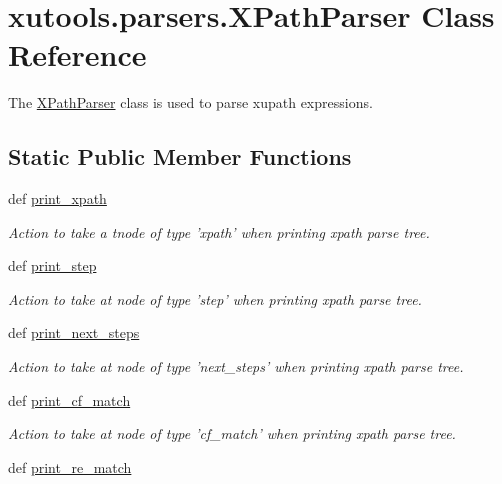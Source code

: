 \hypertarget{classxutools_1_1parsers_1_1_x_path_parser}{\section{xutools.\-parsers.\-X\-Path\-Parser Class Reference}
\label{classxutools_1_1parsers_1_1_x_path_parser}
}


The \hyperlink{classxutools_1_1parsers_1_1_x_path_parser}{X\-Path\-Parser} class is used to parse xupath expressions.  


\subsection*{Static Public Member Functions}
\begin{DoxyCompactItemize}
\item 
def \hyperlink{classxutools_1_1parsers_1_1_x_path_parser_ab00288a4a70d10d079cf2e6ed771c233}{print\-\_\-xpath}
\begin{DoxyCompactList}\small\item\em Action to take a tnode of type 'xpath' when printing xpath parse tree. \end{DoxyCompactList}\item 
def \hyperlink{classxutools_1_1parsers_1_1_x_path_parser_ad75595ece121f86d16d784636ffdf96c}{print\-\_\-step}
\begin{DoxyCompactList}\small\item\em Action to take at node of type 'step' when printing xpath parse tree. \end{DoxyCompactList}\item 
def \hyperlink{classxutools_1_1parsers_1_1_x_path_parser_a6a04eb60bf1047384e7d24a11a4d217b}{print\-\_\-next\-\_\-steps}
\begin{DoxyCompactList}\small\item\em Action to take at node of type 'next\-\_\-steps' when printing xpath parse tree. \end{DoxyCompactList}\item 
def \hyperlink{classxutools_1_1parsers_1_1_x_path_parser_a82f70a03e8c82ebeadefa802fc921f26}{print\-\_\-cf\-\_\-match}
\begin{DoxyCompactList}\small\item\em Action to take at node of type 'cf\-\_\-match' when printing xpath parse tree. \end{DoxyCompactList}\item 
def \hyperlink{classxutools_1_1parsers_1_1_x_path_parser_a5434aa2861e3230a3e41ca81766c27b4}{print\-\_\-re\-\_\-match}

\end{DoxyCompactItemize}

